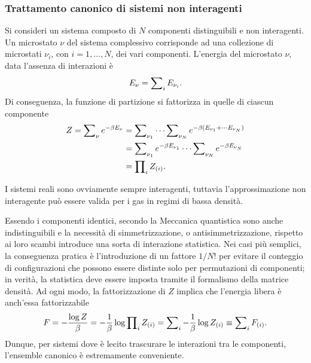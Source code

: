 \subsubsection{Trattamento canonico di sistemi non interagenti}
Si consideri un sistema composto di $N$ componenti distinguibili e non interagenti. Un microstato $\nu$ del sistema complessivo corrisponde ad una collezione di microstati $\nu_i$, con $i = 1,\dots,N$, dei vari componenti. L'energia del microstato $\nu$, data l'assenza di interazioni è
\begin{equation}
\label{eq: energia sistema non interagente (canonico)}
    E_\nu = \sum\nolimits_iE_{\nu_i}.
\end{equation}
Di conseguenza, la funzione di partizione si fattorizza in quelle di ciascun componente
\begin{equation}
\label{eq: funzione di partizione sistemi non interagenti (canonico)}
    \begin{split}
        Z = \sum\nolimits_\nu e^{-\beta E_\nu} &= \sum\nolimits_{\nu_1}\cdots\sum\nolimits_{\nu_N}e^{-\beta(E_{\nu_1} + \cdots E_{\nu_N})} \\
        &= \sum\nolimits_{\nu_1}e^{-\beta E_{\nu_1}}\cdots \sum\nolimits_{\nu_N}e^{-\beta E_{\nu_N}} \\
        &= \prod\nolimits_iZ_{(i)}.
    \end{split}
\end{equation}
\begin{obs}
    I sistemi reali sono ovviamente sempre interagenti, tuttavia l'approssimazione non interagente può essere valida per i gas in regimi di bassa densità.
\end{obs}
Essendo i componenti identici, secondo la Meccanica quantistica sono anche indistinguibili e la necessità di simmetrizzazione, o antisimmetrizzazione, rispetto ai loro scambi introduce una sorta di interazione statistica. Nei casi più semplici, la conseguenza pratica è l'introduzione di un fattore $1/N!$ per evitare il conteggio di configurazioni che possono essere distinte solo per permutazioni di componenti; in verità, la statistica deve essere imposta tramite il formalismo della matrice densità. Ad ogni modo, la fattorizzazione di $Z$ implica che l'energia libera è anch'essa fattorizzabile
\begin{equation}
    F = -\frac{\log{Z}}{\beta} = -\frac{1}{\beta}\log{\prod\nolimits_iZ_{(i)}} = \sum\nolimits_i-\frac{1}{\beta}\log{Z_{(i)}} \equiv \sum\nolimits_i F_{(i)}.
\end{equation}
Dunque, per sistemi dove è lecito trascurare le interazioni tra le componenti, l'ensemble canonico è estremamente conveniente.

